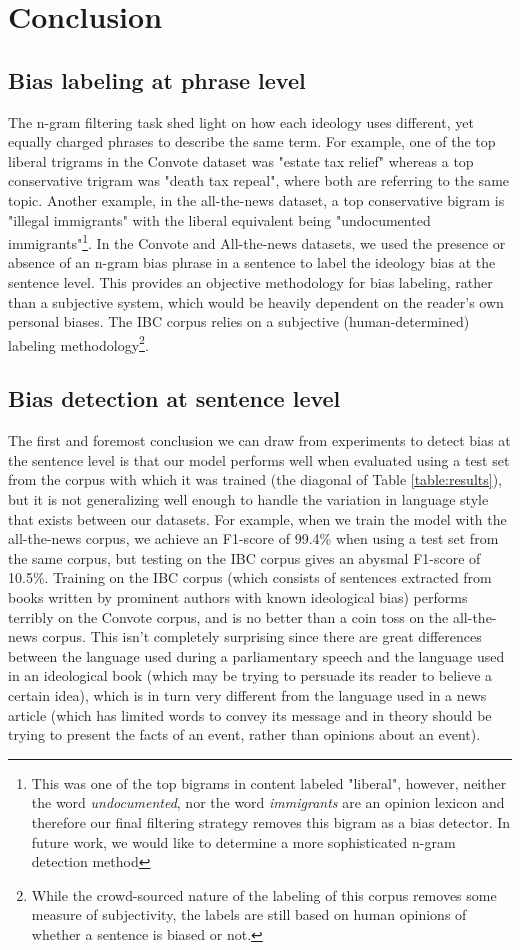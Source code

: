 \documentclass[10pt,a4paper,onecolumn]{article}
\begin{document}
\section{Conclusion}
\subsection{Bias labeling at phrase level}
The n-gram filtering task shed light on how each ideology uses different, yet equally charged phrases to describe the same term. For example, one of the top liberal trigrams in the Convote dataset was "estate tax relief" whereas a top conservative trigram was "death tax repeal", where both are referring to the same topic. Another example, in the all-the-news dataset, a top conservative bigram is "illegal immigrants" with the liberal equivalent being "undocumented immigrants"\footnote{This was one of the top bigrams in content labeled "liberal", however, neither the word \textit{undocumented}, nor the word \textit{immigrants} are an opinion lexicon and therefore our final filtering strategy removes this bigram as a bias detector. In future work, we would like to determine a more sophisticated n-gram detection method}. In the Convote and All-the-news datasets, we used the presence or absence of an n-gram bias phrase in a sentence to label the ideology bias at the sentence level. This provides an objective methodology for bias labeling, rather than a subjective system, which would be heavily dependent on the reader's own personal biases. The IBC corpus relies on a subjective (human-determined) labeling methodology\footnote{While the crowd-sourced nature of the labeling of this corpus removes some measure of subjectivity, the labels are still based on human opinions of whether a sentence is biased or not.}. 

\subsection{Bias detection at sentence level} 
The first and foremost conclusion we can draw from experiments to detect bias at the sentence level is that our model performs well when evaluated using a test set from the corpus with which it was trained (the diagonal of Table \ref{table:results}), but it is not generalizing well enough to handle the variation in language style that exists between our datasets. For example, when we train the model with the all-the-news corpus, we achieve an F1-score of 99.4\% when using a test set from the same corpus, but testing on the IBC corpus gives an abysmal F1-score of 10.5\%. Training on the IBC corpus (which consists of sentences extracted from books written by prominent authors with known ideological bias) performs terribly on the Convote corpus, and is no better than a coin toss on the all-the-news corpus. This isn't completely surprising since there are great differences between the language used during a parliamentary speech and the language used in an ideological book (which may be trying to persuade its reader to believe a certain idea), which is in turn very different from the language used in a news article (which has limited words to convey its message and in theory should be trying to present the facts of an event, rather than opinions about an event).
\end{document}
